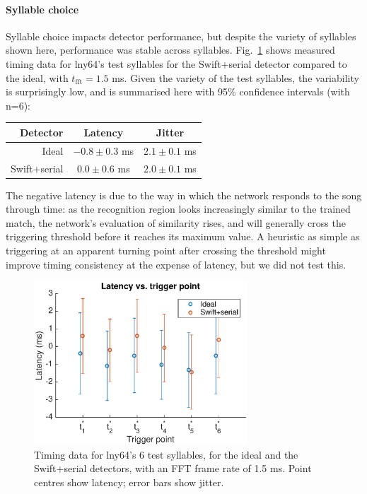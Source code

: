 \documentclass[10pt,letterpaper]{article}
\newcommand\fig[1]{Fig.~\ref{#1}}
\renewcommand{\subsubsection}[1]{\paragraph{#1}}
\begin{document}
\subsubsection{Syllable choice}

Syllable choice impacts detector performance, but despite the variety
of syllables shown here, performance was stable across syllables.
\fig{fig:TimingVsSyllable} shows measured timing data for lny64's test
syllables for the Swift+serial detector compared to the ideal, with
$t_{\textrm{fft}}=1.5$ ms.  Given the variety of the test syllables,
the variability is surprisingly low, and is summarised here with 95\%
confidence intervals (with n=6):
\vspace{8pt}\par\noindent
\begin{tabular}{r|cc}
  Detector & Latency & Jitter \\ 
  \hline   Ideal & $-0.8\pm 0.3$ ms & $2.1\pm 0.1$ ms \\
  Swift+serial & $0.0\pm 0.6$ ms & $2.0\pm 0.1$ ms
\end{tabular}
\vspace{8pt}\par\noindent
The negative latency is due to the way in which the network responds
to the song through time: as the recognition region looks increasingly
similar to the trained match, the network's evaluation of similarity
rises, and will generally cross the triggering threshold before it
reaches its maximum value.  A heuristic as simple as triggering at an
apparent turning point after crossing the threshold might improve
timing consistency at the expense of latency, but we did not test this.

\begin{figure}
  \begin{center}
    \includegraphics[width=8cm]{Fig5}
  \end{center}
  \caption{Timing data for lny64's 6 test syllables, for the ideal and the
    Swift+serial detectors, with an FFT frame rate of 1.5 ms.  Point
    centres show latency; error bars show jitter.}
  \label{fig:TimingVsSyllable}
\end{figure}
\end{document}

